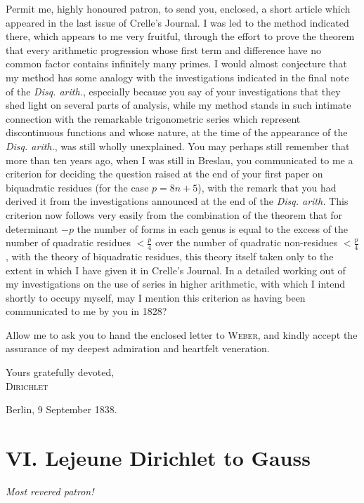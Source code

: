\documentclass[11pt]{article}
\newcommand{\scn}[1]{\textsc{#1}}
\begin{document}
Permit me, highly honoured patron, to send you, enclosed, a short article which appeared in the last issue of Crelle's Journal. I was led to the method indicated there, which appears to me very fruitful, through the effort to prove the theorem that every arithmetic progression whose first term and difference have no common factor contains infinitely many primes. I would almost conjecture that my method has some analogy with the investigations indicated in the final note of the \emph{Disq. arith.}, especially because you say of your investigations that they shed light on several parts of analysis, while my method stands in such intimate connection with the remarkable trigonometric series which represent discontinuous functions and whose nature, at the time of the appearance of the \emph{Disq. arith.}, was still wholly unexplained. You may perhaps still remember that more than ten years ago, when I was still in Breslau, you communicated to me a criterion for deciding the question raised at the end of your first paper on biquadratic residues (for the case $p=8n+5$), with the remark that you had derived it from the investigations announced at the end of the \emph{Disq. arith.} This criterion now follows very easily from the combination of the theorem that for determinant $-p$ the number of forms in each genus is equal to the excess of the number of quadratic residues $<\frac p4$ over the number of quadratic non-residues $<\frac p4$, with the theory of biquadratic residues, this theory itself taken only to the extent in which I have given it in Crelle's Journal. In a detailed working out of my investigations on the use of series in higher arithmetic, with which I intend shortly to occupy myself, may I mention this criterion as having been communicated to me by you in 1828?

Allow me to ask you to hand the enclosed letter to \scn{Weber}, and kindly accept the assurance of my deepest admiration and heartfelt veneration.

\begin{flushright}
Yours gratefully devoted,\\
\scn{Dirichlet}
\end{flushright}
Berlin, 9 September 1838.

\section*{VI. Lejeune Dirichlet to Gauss}
\begin{center}\emph{Most revered patron!}\end{center}
\end{document}

